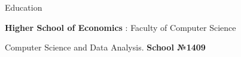 \begin{rubric}{Education}

\entry*[2021 -- 2026]%
	\textbf{Higher School of Economics} : Faculty of Computer Science \par
	{Computer Science and Data Analysis}.
 \entry*[2010 -- 2021]%
	\textbf {School №1409}
\end{rubric}